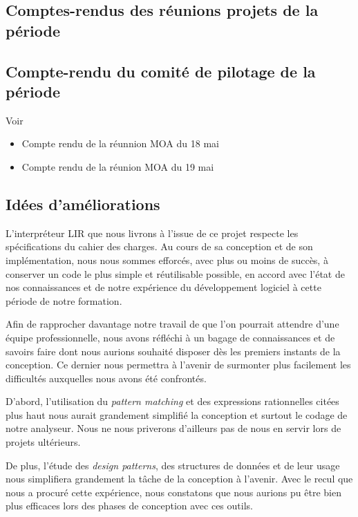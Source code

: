 \documentclass[12pt,a4paper,titlepage,openany, oneside]{report}
\begin{document}
    \subsection{Comptes-rendus des réunions projets de la période}

    \subsection{Compte-rendu du comité de pilotage de la période}
        Voir
        \begin{itemize}
            \item Compte rendu de la réunnion MOA du 18 mai
            \item Compte rendu de la réunion MOA du 19 mai
        \end{itemize}

    \subsection{Idées d'améliorations}
        L'interpréteur LIR que nous livrons à l'issue de ce projet respecte les
        spécifications du cahier des charges. Au cours de sa conception et de son implémentation, nous nous
        sommes efforcés, avec plus ou moins de succès, à conserver un code le plus
        simple et réutilisable possible, en accord avec l'état de nos connaissances et
        de notre expérience du développement logiciel à cette période de notre formation.

        Afin de rapprocher davantage notre travail de que l'on pourrait attendre d'une
        équipe professionnelle, nous avons réfléchi à un bagage de connaissances et de
        savoirs faire dont nous aurions souhaité disposer dès les premiers instants de la
        conception. Ce dernier nous permettra à l'avenir de surmonter plus facilement
        les difficultés auxquelles nous avons été confrontés.

        D'abord, l'utilisation du \emph{pattern matching} et des expressions
        rationnelles citées plus haut nous aurait grandement simplifié la conception et
        surtout le codage de notre analyseur. Nous ne nous priverons d'ailleurs pas de
        nous en servir lors de projets ultérieurs.

        De plus, l'étude des \emph{design patterns}, des structures de données et de leur
        usage nous simplifiera grandement la tâche de la conception à l'avenir. Avec le
        recul que nous a procuré cette expérience, nous constatons que nous aurions
        pu être bien plus efficaces lors des phases de conception avec ces outils.
\end{document}
